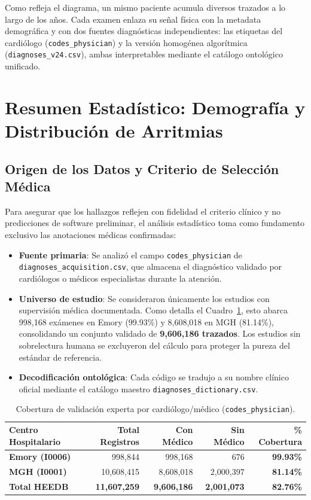 \documentclass[11pt,a4paper]{article}
\begin{document}
Como refleja el diagrama, un mismo paciente acumula diversos trazados a lo largo de los años. Cada examen enlaza su señal física con la metadata demográfica y con dos fuentes diagnósticas independientes: las etiquetas del cardiólogo (\texttt{codes\_physician}) y la versión homogénea algorítmica (\texttt{diagnoses\_v24.csv}), ambas interpretables mediante el catálogo ontológico unificado.
\newpage

\section{Resumen Estadístico: Demografía y Distribución de Arritmias}

\subsection{Origen de los Datos y Criterio de Selección Médica}
Para asegurar que los hallazgos reflejen con fidelidad el criterio clínico y no predicciones de software preliminar, el análisis estadístico toma como fundamento exclusivo las anotaciones médicas confirmadas:
\begin{itemize}
    \item \textbf{Fuente primaria}: Se analizó el campo \texttt{codes\_physician} de \nolinkurl{diagnoses_acquisition.csv}, que almacena el diagnóstico validado por cardiólogos o médicos especialistas durante la atención.
    \item \textbf{Universo de estudio}: Se consideraron únicamente los estudios con supervisión médica documentada. Como detalla el Cuadro~\ref{tab:cobertura}, esto abarca 998,168 exámenes en Emory (99.93\%) y 8,608,018 en MGH (81.14\%), consolidando un conjunto validado de \textbf{9,606,186 trazados}. Los estudios sin sobrelectura humana se excluyeron del cálculo para proteger la pureza del estándar de referencia.
    \item \textbf{Decodificación ontológica}: Cada código se tradujo a su nombre clínico oficial mediante el catálogo maestro \nolinkurl{diagnoses_dictionary.csv}.
\end{itemize}

\begin{table}[htbp]
\centering
\small
\renewcommand{\arraystretch}{1.10}
\begin{tabularx}{\textwidth}{@{} X rrrr @{}}
\toprule
\textbf{Centro Hospitalario} & \textbf{Total Registros} & \textbf{Con Médico} & \textbf{Sin Médico} & \textbf{\% Cobertura} \\
\midrule
\textbf{Emory (I0006)} & 998,844 & 998,168 & 676 & \textbf{99.93\%} \\
\textbf{MGH (I0001)}   & 10,608,415 & 8,608,018 & 2,000,397 & \textbf{81.14\%} \\
\midrule
\textbf{Total HEEDB}   & \textbf{11,607,259} & \textbf{9,606,186} & \textbf{2,001,073} & \textbf{82.76\%} \\
\bottomrule
\end{tabularx}
\caption{Cobertura de validación experta por cardiólogo/médico (\texttt{codes\_physician}).}
\label{tab:cobertura}
\end{table}
\end{document}
